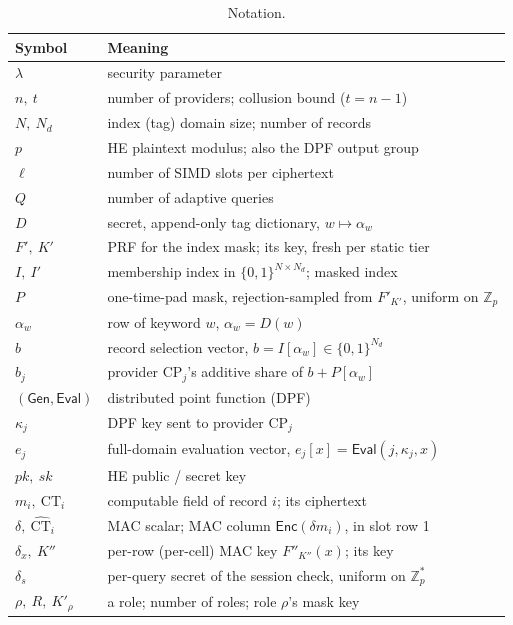 \documentclass[a4paper,fleqn]{cas-sc}
\newcommand{\Gen}{\mathsf{Gen}}
\newcommand{\Eval}{\mathsf{Eval}}
\newcommand{\Enc}{\mathsf{Enc}}
\begin{document}
\begin{table}[pos=htbp]
\caption{Notation.}
\label{tab:notation}
\centering
\footnotesize
\setlength{\tabcolsep}{4pt}
\begin{tabular}{@{}l>{\raggedright\arraybackslash}p{5.5cm}@{}}
\toprule
Symbol & Meaning \\
\midrule
$\lambda$ & security parameter \\
$n,\ t$ & number of providers; collusion bound ($t=n-1$) \\
$N,\ N_d$ & index (tag) domain size; number of records \\
$p$ & HE plaintext modulus; also the DPF output group \\
$\ell$ & number of SIMD slots per ciphertext \\
$Q$ & number of adaptive queries \\
$D$ & secret, append-only tag dictionary, $w\mapsto\alpha_w$ \\
$F',\ K'$ & PRF for the index mask; its key, fresh per static tier \\
$I,\ I'$ & membership index in $\{0,1\}^{N\times N_d}$; masked index \\
$P$ & one-time-pad mask, rejection-sampled from $F'_{K'}$, uniform on
$\mathbb{Z}_p$ \\
$\alpha_w$ & row of keyword $w$, $\alpha_w=D(w)$ \\
$b$ & record selection vector, $b=I[\alpha_w]\in\{0,1\}^{N_d}$ \\
$b_j$ & provider $\text{CP}_j$'s additive share of $b+P[\alpha_w]$ \\
$(\Gen,\Eval)$ & distributed point function (DPF) \\
$\kappa_j$ & DPF key sent to provider $\text{CP}_j$ \\
$e_j$ & full-domain evaluation vector, $e_j[x]=\Eval(j,\kappa_j,x)$ \\
$pk,\ sk$ & HE public / secret key \\
$m_i,\ \text{CT}_i$ & computable field of record $i$; its ciphertext \\
$\delta,\ \widehat{\text{CT}}_i$ & MAC scalar; MAC column $\Enc(\delta m_i)$,
in slot row 1 \\
$\delta_x,\ K''$ & per-row (per-cell) MAC key $F''_{K''}(x)$; its key \\
$\delta_s$ & per-query secret of the session check, uniform on $\mathbb{Z}_p^{*}$ \\
$\rho,\ R,\ K'_\rho$ & a role; number of roles; role $\rho$'s mask key \\

\end{tabular}
\end{table}
\end{document}

